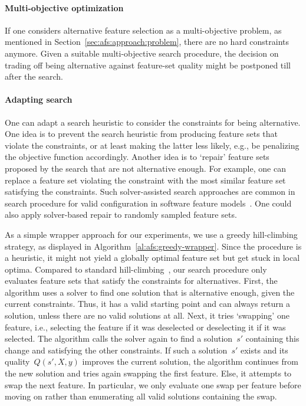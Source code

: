 \documentclass{article}
\theoremstyle{definition}
\begin{document}
\paragraph{Multi-objective optimization}

If one considers alternative feature selection as a multi-objective problem, as mentioned in Section~\ref{sec:afs:approach:problem}, there are no hard constraints anymore.
Given a suitable multi-objective search procedure, the decision on trading off being alternative against feature-set quality might be postponed till after the search.

\paragraph{Adapting search}

One can adapt a search heuristic to consider the constraints for being alternative.
One idea is to prevent the search heuristic from producing feature sets that violate the constraints, or at least making the latter less likely, e.g., be penalizing the objective function accordingly.
Another idea is to `repair' feature sets proposed by the search that are not alternative enough.
For example, one can replace a feature set violating the constraint with the most similar feature set satisfying the constraints.
Such solver-assisted search approaches are common in search procedure for valid configuration in software feature models~\cite{guo2018preserve, henard2015combining, white2010automated}.
One could also apply solver-based repair to randomly sampled feature sets.

As a simple wrapper approach for our experiments, we use a greedy hill-climbing strategy, as displayed in Algorithm~\ref{al:afs:greedy-wrapper}.
Since the procedure is a heuristic, it might not yield a globally optimal feature set but get stuck in local optima.
Compared to standard hill-climbing~\cite{kohavi1997wrappers}, our search procedure only evaluates feature sets that satisfy the constraints for alternatives.
First, the algorithm uses a solver to find one solution that is alternative enough, given the current constraints.
Thus, it has a valid starting point and can always return a solution, unless there are no valid solutions at all.
Next, it tries `swapping' one feature, i.e., selecting the feature if it was deselected or deselecting it if it was selected.
The algorithm calls the solver again to find a solution~$s'$ containing this change and satisfying the other constraints.
If such a solution~$s'$ exists and its quality~$Q(s',X,y)$ improves the current solution, the algorithm continues from the new solution and tries again swapping the first feature.
Else, it attempts to swap the next feature.
In particular, we only evaluate one swap per feature before moving on rather than enumerating all valid solutions containing the swap.
\end{document}
